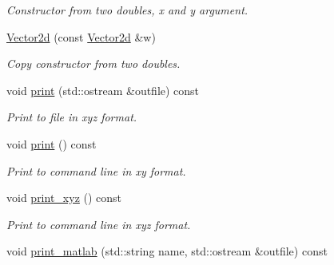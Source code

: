 \begin{DoxyCompactItemize}
\begin{DoxyCompactList}\small\item\em Constructor from two doubles, x and y argument. \end{DoxyCompactList}\item 
\mbox{\label{classtopology_1_1Vector2d_add78376beadec0692919ada648dacc26}} 
\mbox{\hyperlink{classtopology_1_1Vector2d_add78376beadec0692919ada648dacc26}{Vector2d}} (const \mbox{\hyperlink{classtopology_1_1Vector2d}{Vector2d}} \&w)
\begin{DoxyCompactList}\small\item\em Copy constructor from two doubles. \end{DoxyCompactList}\item 
\mbox{\label{classtopology_1_1Vector2d_a7287b98091215d9debe3ad333507abf2}} 
void \mbox{\hyperlink{classtopology_1_1Vector2d_a7287b98091215d9debe3ad333507abf2}{print}} (std\+::ostream \&outfile) const
\begin{DoxyCompactList}\small\item\em Print to file in xyz format. \end{DoxyCompactList}\item 
\mbox{\label{classtopology_1_1Vector2d_a57cc1066f77af8e42d713ebee2705814}} 
void \mbox{\hyperlink{classtopology_1_1Vector2d_a57cc1066f77af8e42d713ebee2705814}{print}} () const
\begin{DoxyCompactList}\small\item\em Print to command line in xy format. \end{DoxyCompactList}\item 
\mbox{\label{classtopology_1_1Vector2d_a451052a0c4ea5d514f614b46bd4b7069}} 
void \mbox{\hyperlink{classtopology_1_1Vector2d_a451052a0c4ea5d514f614b46bd4b7069}{print\+\_\+xyz}} () const
\begin{DoxyCompactList}\small\item\em Print to command line in xyz format. \end{DoxyCompactList}\item 
\mbox{\label{classtopology_1_1Vector2d_a2bf593266241d05b8aa66ad86aaa32df}} 
void \mbox{\hyperlink{classtopology_1_1Vector2d_a2bf593266241d05b8aa66ad86aaa32df}{print\+\_\+matlab}} (std\+::string name, std\+::ostream \&outfile) const

\end{DoxyCompactItemize}
